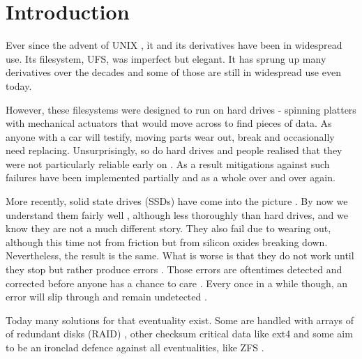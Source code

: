 \chapter*{Introduction}
    \label{ch:intro}

    Ever since the advent of UNIX \cite{UFS}, it and its derivatives have been
    in widespread use. Its filesystem, UFS, was imperfect \cite{FFS} but
    elegant. It has sprung up many derivatives \cite{FFS, LFS, WAFL,
    ext4_origin, ZFS, XFS_scalability} over the decades and some of those are
    still in widespread use even today.

    However, these filesystems were designed to run on hard drives - spinning
    platters with mechanical actuators that would move across to find pieces of
    data. As anyone with a car will testify, moving parts wear out, break and
    occasionally need replacing. Unsurprisingly, so do hard drives and people
    realised that they were not particularly reliable early on
    \cite{Backblaze_stats, hard_drive_failures, RAID,
    data_corruption_storage_stack}. As a result mitigations against such
    failures have been implemented partially \cite{FFS, ext4_docs} and as a
    whole \cite{ZFS} over and over again.


    More recently, solid state drives (SSDs) have come into the picture
    \cite{SSD_sales}. By now we understand them fairly well
    \cite{flash_error_manual}, although less thoroughly than hard drives, and
    we know they are not a much different story. They also fail due to wearing
    out, although this time not from friction but from silicon oxides
    breaking down. Nevertheless, the result is the same. What is worse is that
    they do not work until they stop but rather produce errors \cite{bit_error_mlc,
    bit_error_qlc, flash_large_scale}. Those errors are oftentimes detected and
    corrected before anyone has a chance to care \cite{flash_error_manual}.
    Every once in a while though, an error will slip through and remain
    undetected \cite{flash_reliability}.

    Today many solutions for that eventuality exist. Some are handled with
    arrays of of redundant disks (RAID) \cite{RAID}, other checksum critical
    data like ext4 \cite{ext4_docs} and some aim to be an ironclad defence
    against all eventualities, like ZFS \cite{ZFS}.

